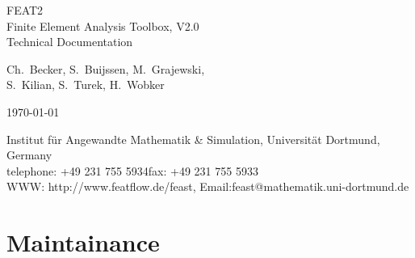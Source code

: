 \documentclass[10pt,a4paper]{report}
\begin{document}
\begin{titlepage}

\vspace*{4cm}

\begin{center}

{\Huge FEAT2}\\[2cm] 
{\huge Finite Element Analysis Toolbox, V2.0}\\[0.5cm] 

{\LARGE Technical Documentation}\\[3cm]

\vspace*{0.5cm}

{\large
 Ch.~Becker, S.~Buijssen, M.~Grajewski,\\[1em]
 S.~Kilian, S.~Turek, H.~Wobker}

\vspace*{2cm}

\today

\vspace*{2cm}

Institut f{\"u}r Angewandte Mathematik \& Simulation, Universit{\"a}t Dortmund, Germany \\[0.5em]
telephone: +49 231 755 5934\qquad fax: +49 231 755 5933 \\[0.5em]
WWW: http://www.featflow.de/feast, Email:feast@mathematik.uni-dortmund.de

\end{center}

\end{titlepage}


\tableofcontents


\chapter{Maintainance}












%


\end{document}
